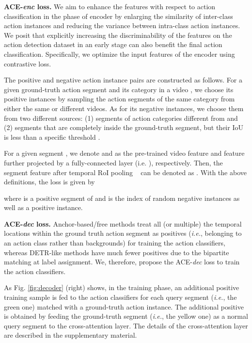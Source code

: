 \documentclass[runningheads]{llncs}
\def\ie{{\em i.e.}}
\newcommand{\figref}[1]{Fig. \ref{#1}}
\begin{document}
\textbf{ACE-\emph{enc} loss.} We aim to enhance the features with respect to action classification in the phase of encoder by enlarging the similarity of inter-class action instances and reducing the variance between intra-class action instances. 
We posit that explicitly increasing the discriminability of the features on the action detection dataset in an early stage can also benefit the final action classification.
Specifically, we optimize the input features of the encoder using contrastive loss.

The positive and negative action instance pairs are constructed as follows. For a given ground-truth action segment  and its category  in a video , we choose its positive instances by sampling the action segments of the same category  from either the same or different videos. As for its negative instances, we choose them from two different sources: (1) segments of action categories different from  and (2) segments that are completely inside the ground-truth segment, but their IoU is less than a specific threshold . 

For a given segment , we denote  and  as the pre-trained video feature and feature further projected by a fully-connected layer  (i.e. ), respectively. Then, the segment feature after temporal RoI pooling ~\cite{xu2020g} can be denoted as . With the above definitions, the loss  is given by   


where  is a positive segment of  and  is the index of  random negative instances as well as a positive instance.



\textbf{ACE-\emph{dec} loss.} 
Anchor-based/free methods treat all (or multiple) the temporal locations within the ground truth action segment as positives (\ie, belonging to an action class rather than backgrounds) for training the action classifiers, whereas DETR-like methods have much fewer positives due to the bipartite matching at label assignment. We,  therefore, propose the ACE-\emph{dec} loss to train the action classifiers. 


As \figref{fig:decoder} (right) shows, in the training phase, an additional positive training sample is fed to the action classifiers for each query segment (\ie, the green one) matched with a ground-truth action instance. The additional positive is obtained by feeding the ground-truth segment (\ie, the yellow one) as a normal query segment to the cross-attention layer.
The details of the cross-attention layer are described in the supplementary material. 
\end{document}
